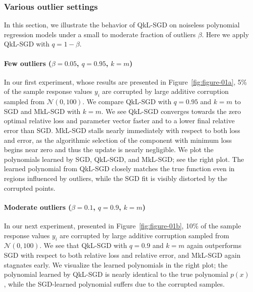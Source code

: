 \documentclass[11pt]{article}
\begin{document}
\subsubsection{Various outlier settings}

In this section, we illustrate the behavior of QkL-SGD on noiseless polynomial regression models under a small to moderate fraction of outliers $\beta$.  Here we apply QkL-SGD with $q = 1 - \beta$.

\paragraph{Few outliers (\texorpdfstring{$\beta = 0.05$, $q = 0.95$, $k = m$}{beta = 0.05, q = 0.95, k = m})}

In our first experiment, whose results are presented in Figure~\ref{fig:figure-01a}, 5\% of the sample response values $y_i$ are corrupted by large additive corruption sampled from $\mathcal{N}(0,100)$. We compare QkL-SGD with $q =0.95$ and $k = m$ to SGD and MkL-SGD with $k = m$.  We see QkL-SGD converges towards the zero optimal relative loss
and parameter vector faster and to a lower final relative error
than SGD.  MkL-SGD stalls nearly immediately with respect to both loss and error, as the algorithmic selection of the component with minimum loss begins near zero and thus the update is nearly negligible. We plot the polynomials learned by SGD, QkL-SGD, and MkL-SGD; see the right plot. The learned polynomial from QkL-SGD closely matches the true function even in regions influenced by outliers, while the SGD fit is visibly distorted by the corrupted points.


\paragraph{Moderate outliers (\texorpdfstring{$\beta = 0.1$, $q = 0.9$, $k = m$}{beta = 0.1, q = 0.9, k = m})}

In our next experiment, presented in Figure~\ref{fig:figure-01b}, 10\% of the sample response values $y_i$ are corrupted by large additive corruption sampled from $\mathcal{N}(0,100)$.  We see that QkL-SGD with $q = 0.9$ and $k = m$ again outperforms SGD with respect to both relative loss
and relative error,
and MkL-SGD again stagnates early.  We visualize the learned polynomials in the right plot; the polynomial learned by QkL-SGD is nearly identical to the true polynomial $p(x)$, while the SGD-learned polynomial suffers due to the corrupted samples.
\end{document}
